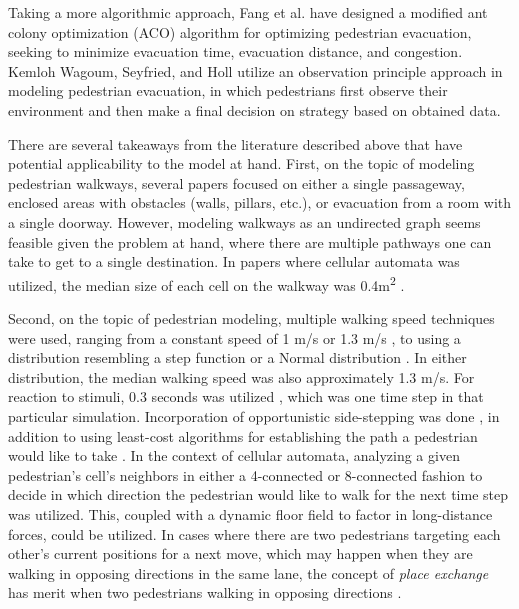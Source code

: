 \documentclass[12pt]{article}
\begin{document}
Taking a more algorithmic approach, Fang et al. \cite{fang2011hierarchical} have
designed a modified ant colony optimization (ACO) algorithm for optimizing
pedestrian evacuation, seeking to minimize evacuation time, evacuation distance,
and congestion. Kemloh Wagoum, Seyfried, and Holl \cite{kemloh2012modeling}
utilize an observation principle approach in modeling pedestrian evacuation,
in which pedestrians first observe their environment and then make a final
decision on strategy based on obtained data.

There are several takeaways from the literature described above that have
potential applicability to the model at hand. First, on the topic of modeling
pedestrian walkways, several papers focused on either a single passageway,
enclosed areas with obstacles (walls, pillars, etc.), or evacuation from a
room with a single doorway. However, modeling walkways as an undirected graph
\cite{fang2011hierarchical} seems feasible given the problem at hand, where
there are multiple pathways one can take to get to a single destination. In
papers where cellular automata was utilized, the median size of each cell on the
walkway was 0.4m\textsuperscript{2}
\cite{blue2001cellular,burstedde2001simulation,weifeng2003simulation}.

Second, on the topic of pedestrian modeling, multiple walking speed techniques
were used, ranging from a constant speed of 1 m/s \cite{weifeng2003simulation}
or 1.3 m/s \cite{burstedde2001simulation}, to using a distribution resembling a
step function \cite{blue2001cellular} or a Normal distribution
\cite{klupfel2005models}. In either distribution, the median walking speed was
also approximately 1.3 m/s. For reaction to stimuli, 0.3 seconds was utilized
\cite{burstedde2001simulation}, which was one time step in that particular
simulation. Incorporation of opportunistic side-stepping was done
\cite{blue2001cellular}, in addition to using least-cost algorithms for
establishing the path a pedestrian would like to take
\cite{fang2011hierarchical}. In the context of cellular automata, analyzing a
given pedestrian's cell's neighbors in either a 4-connected
\cite{weifeng2003simulation} or 8-connected fashion
\cite{burstedde2001simulation} to decide in which direction the pedestrian would
like to walk for the next time step was utilized. This, coupled with a dynamic
floor field \cite{burstedde2001simulation} to factor in long-distance forces,
could be utilized. In cases where there are two pedestrians targeting each other's
current positions for a next move, which may happen when they are walking in
opposing directions in the same lane, the concept of \textit{place exchange}
has merit when two pedestrians walking in opposing directions \cite{blue2001cellular}.
\end{document}
